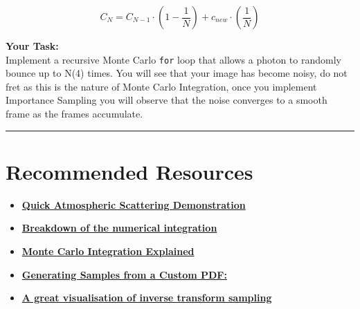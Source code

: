 \documentclass[12pt]{article}
\begin{document}
\begin{equation}
    C_N = C_{N-1} \cdot \left(1 - \frac{1}{N}\right) + c_{new} \cdot \left(\frac{1}{N}\right)
\end{equation}

\vspace{0.2cm}\noindent\textbf{Your Task:}\\
Implement a recursive Monte Carlo \texttt{for} loop that allows a photon to randomly bounce up to N(4) times. You will see that your image has become noisy, do not fret as this is the nature of Monte Carlo Integration, once you implement Importance Sampling you will observe that the noise converges to a smooth frame as the frames accumulate.
\vspace{0.5cm}\hrule\vspace{0.5cm}

\section*{Recommended Resources}

\begin{itemize}
    \item \href{https://www.youtube.com/shorts/B6VmINDeIS8}{\textbf{Quick Atmospheric Scattering Demonstration}} 
    \item \href{https://www.scratchapixel.com/lessons/3d-basic-rendering/volume-rendering-for-developers/intro-volume-rendering.html}{\textbf{Breakdown of the numerical integration}} 
    \item \href{https://www.youtube.com/watch?v=0zbLv2k17vU}{\textbf{Monte Carlo Integration Explained}} 
    \item \href{https://medium.com/data-science/an-insight-on-generating-samples-from-a-custom-probability-density-function-d0a06c290c54}{\textbf{Generating Samples from a Custom PDF:}}
    \item \href{https://www.youtube.com/watch?v=nxxAcCuu0PE}{\textbf{A great visualisation of inverse transform sampling
}}

\end{itemize}
\end{document}

